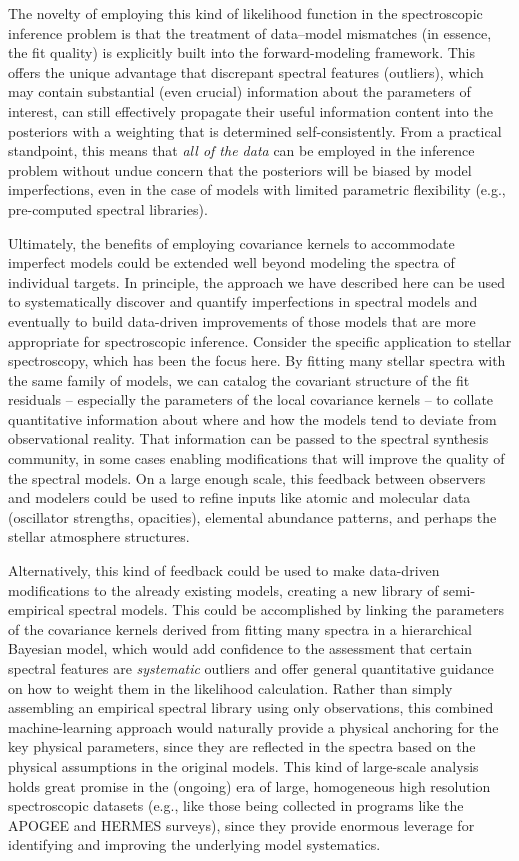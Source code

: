 \documentclass[iop,floatfix]{emulateapj}
\begin{document}
The novelty of employing this kind of likelihood function in the spectroscopic inference problem is 
that the treatment of data--model mismatches (in essence, the fit quality) is explicitly built into 
the forward-modeling framework.  This offers the unique advantage that discrepant spectral features 
(outliers), which may contain substantial (even crucial) information about the parameters of 
interest, can still effectively propagate their useful information content into the posteriors with 
a weighting that is determined self-consistently.  From a practical standpoint, this means that 
{\it all of the data} can be employed in the inference problem without undue concern that the 
posteriors will be biased by model imperfections, even in the case of models with limited 
parametric flexibility (e.g., pre-computed spectral libraries).

Ultimately, the benefits of employing covariance kernels to accommodate imperfect models could 
be extended well beyond modeling the spectra of individual targets.  In principle, the approach we 
have described here can be used to systematically discover and quantify imperfections in spectral 
models and eventually to build data-driven improvements of those models that are more appropriate 
for spectroscopic inference.  Consider the specific application to stellar spectroscopy, which has 
been the focus here.  By fitting many stellar spectra with the same family of models, we can 
catalog the covariant structure of the fit residuals -- especially the parameters of the local 
covariance kernels -- to collate quantitative information about where and how the models tend to 
deviate from observational reality.  That information can be passed to the spectral synthesis 
community, in some cases enabling modifications that will improve the quality of the spectral 
models.  On a large enough scale, this feedback between observers and modelers could be used to 
refine inputs like atomic and molecular data (oscillator strengths, opacities), elemental abundance 
patterns, and perhaps the stellar atmosphere structures.

Alternatively, this kind of feedback could be used to make data-driven modifications to the already 
existing models, creating a new library of semi-empirical spectral models.  This could be 
accomplished by linking the parameters of the covariance kernels derived from fitting many spectra 
in a hierarchical Bayesian model, which would add confidence to the assessment that certain 
spectral features are {\it systematic} outliers and offer general quantitative guidance on how to 
weight them in the likelihood calculation.  Rather than simply assembling an empirical spectral 
library using only observations, this combined machine-learning approach would naturally provide a 
physical anchoring for the key physical parameters, since they are reflected in the spectra based 
on the physical assumptions in the original models.  This kind of large-scale analysis holds great 
promise in the (ongoing) era of large, homogeneous high resolution spectroscopic datasets (e.g., 
like those being collected in programs like the APOGEE and HERMES surveys), since they provide 
enormous leverage for identifying and improving the underlying model systematics.
\end{document}
